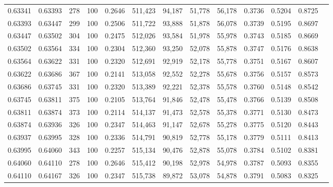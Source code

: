 \begin{tabular}{rrrrrrrrrrrrr}
0.63341 & 0.63393 &   278 & 100 &                                     0.2646 & 511,423 &  94,187 &  51,778 &  56,178 & 0.3736 & 0.5204 & 0.8725 \\
0.63393 & 0.63447 &   299 & 100 &                                     0.2506 & 511,722 &  93,888 &  51,878 &  56,078 & 0.3739 & 0.5195 & 0.8697 \\
0.63447 & 0.63502 &   304 & 100 &                                     0.2475 & 512,026 &  93,584 &  51,978 &  55,978 & 0.3743 & 0.5185 & 0.8669 \\
0.63502 & 0.63564 &   334 & 100 &                                     0.2304 & 512,360 &  93,250 &  52,078 &  55,878 & 0.3747 & 0.5176 & 0.8638 \\
0.63564 & 0.63622 &   331 & 100 &                                     0.2320 & 512,691 &  92,919 &  52,178 &  55,778 & 0.3751 & 0.5167 & 0.8607 \\
0.63622 & 0.63686 &   367 & 100 &                                     0.2141 & 513,058 &  92,552 &  52,278 &  55,678 & 0.3756 & 0.5157 & 0.8573 \\
0.63686 & 0.63745 &   331 & 100 &                                     0.2320 & 513,389 &  92,221 &  52,378 &  55,578 & 0.3760 & 0.5148 & 0.8542 \\
0.63745 & 0.63811 &   375 & 100 &                                     0.2105 & 513,764 &  91,846 &  52,478 &  55,478 & 0.3766 & 0.5139 & 0.8508 \\
0.63811 & 0.63874 &   373 & 100 &                                     0.2114 & 514,137 &  91,473 &  52,578 &  55,378 & 0.3771 & 0.5130 & 0.8473 \\
0.63874 & 0.63936 &   326 & 100 &                                     0.2347 & 514,463 &  91,147 &  52,678 &  55,278 & 0.3775 & 0.5120 & 0.8443 \\
0.63937 & 0.63995 &   328 & 100 &                                     0.2336 & 514,791 &  90,819 &  52,778 &  55,178 & 0.3779 & 0.5111 & 0.8413 \\
0.63995 & 0.64060 &   343 & 100 &                                     0.2257 & 515,134 &  90,476 &  52,878 &  55,078 & 0.3784 & 0.5102 & 0.8381 \\
0.64060 & 0.64110 &   278 & 100 &                                     0.2646 & 515,412 &  90,198 &  52,978 &  54,978 & 0.3787 & 0.5093 & 0.8355 \\
0.64110 & 0.64167 &   326 & 100 &                                     0.2347 & 515,738 &  89,872 &  53,078 &  54,878 & 0.3791 & 0.5083 & 0.8325 \\

\end{tabular}
